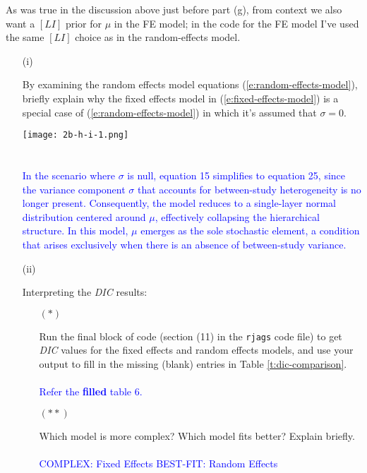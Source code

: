 \documentclass[12pt]{article}
\renewcommand{\i}[1]{\textit{#1}}
\begin{document}
\begin{itemize}
As was true in the discussion above just before part (g), from context we also want a $[ LI ]$ prior for $\mu$ in the FE model; in the code for the FE model I've used the same $[ LI ]$ choice as in the random-effects model.

\begin{itemize}

\item[(i)]

By examining the random effects model equations (\ref{e:random-effects-model}), briefly explain why the fixed effects model in (\ref{e:fixed-effects-model}) is a special case of (\ref{e:random-effects-model}) in which it's assumed that $\sigma = 0$. \textit{\fbox{\textbf{[10 points]}}}

\texttt{[image: 2b-h-i-1.png]} \\
\\ \\
\textcolor{blue}{In the scenario where \( \sigma \) is null, equation 15 simplifies to equation 25, since the variance component \( \sigma \) that accounts for between-study heterogeneity is no longer present. Consequently, the model reduces to a single-layer normal distribution centered around \( \mu \), effectively collapsing the hierarchical structure. In this model, \( \mu \) emerges as the sole stochastic element, a condition that arises exclusively when there is an absence of between-study variance.}
\item[(ii)]

Interpreting the \i{DIC} results:


\begin{itemize}

\item[$( * )$]

Run the final block of code (section (11) in the \texttt{rjags} code file) to get 
\textit{DIC} values for the fixed effects and random effects models, and use your output to fill in the missing (blank) entries in Table \ref{t:dic-comparison}. \textit{\fbox{\textbf{[10 points]}}}
\\ \\
\textcolor{blue}{Refer the \textbf{filled} table 6.}
\item[$( ** )$]

Which model is more complex? Which model fits better? Explain briefly. \\ \textit{\fbox{\textbf{[10 points]}}} \\
\textcolor{blue}{
COMPLEX: Fixed Effects
BEST-FIT: Random Effects
}


\end{itemize}
\end{itemize}
\end{itemize}
\end{document}
